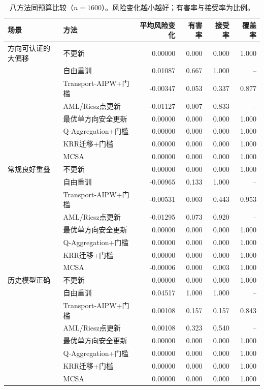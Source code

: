 \begin{table}[ht]
\centering\scriptsize
\caption{八方法同预算比较（$n=1600$）。风险变化越小越好；有害率与接受率为比例。}
\label{tab:eight-main}
\begin{tabular}{llrrrr}
\toprule
场景 & 方法 & 平均风险变化 & 有害率 & 接受率 & 覆盖率\\
\midrule
方向可认证的大偏移 & 不更新 & 0.00000 & 0.000 & 0.000 & 1.000\\
 & 自由重训 & 0.01087 & 0.667 & 1.000 & --\\
 & Transport-AIPW+门槛 & -0.00347 & 0.053 & 0.337 & 0.877\\
 & AML/Riesz点更新 & -0.01127 & 0.007 & 0.833 & --\\
 & 最优单方向安全更新 & 0.00000 & 0.000 & 0.000 & 1.000\\
 & Q-Aggregation+门槛 & 0.00000 & 0.000 & 0.000 & 1.000\\
 & KRR迁移+门槛 & 0.00000 & 0.000 & 0.000 & 1.000\\
 & MCSA & 0.00000 & 0.000 & 0.000 & 1.000\\
\addlinespace
常规良好重叠 & 不更新 & 0.00000 & 0.000 & 0.000 & 1.000\\
 & 自由重训 & -0.00965 & 0.133 & 1.000 & --\\
 & Transport-AIPW+门槛 & -0.00531 & 0.003 & 0.443 & 0.953\\
 & AML/Riesz点更新 & -0.01295 & 0.073 & 0.920 & --\\
 & 最优单方向安全更新 & 0.00000 & 0.000 & 0.000 & 1.000\\
 & Q-Aggregation+门槛 & 0.00000 & 0.000 & 0.000 & 1.000\\
 & KRR迁移+门槛 & 0.00000 & 0.000 & 0.000 & 1.000\\
 & MCSA & -0.00006 & 0.000 & 0.003 & 1.000\\
\addlinespace
历史模型正确 & 不更新 & 0.00000 & 0.000 & 0.000 & 1.000\\
 & 自由重训 & 0.04517 & 1.000 & 1.000 & --\\
 & Transport-AIPW+门槛 & 0.00108 & 0.157 & 0.157 & 0.843\\
 & AML/Riesz点更新 & 0.00108 & 0.323 & 0.540 & --\\
 & 最优单方向安全更新 & 0.00000 & 0.000 & 0.000 & 1.000\\
 & Q-Aggregation+门槛 & 0.00000 & 0.000 & 0.000 & 1.000\\
 & KRR迁移+门槛 & 0.00000 & 0.000 & 0.000 & 1.000\\
 & MCSA & 0.00000 & 0.000 & 0.000 & 1.000\\

\end{tabular}
\end{table}
